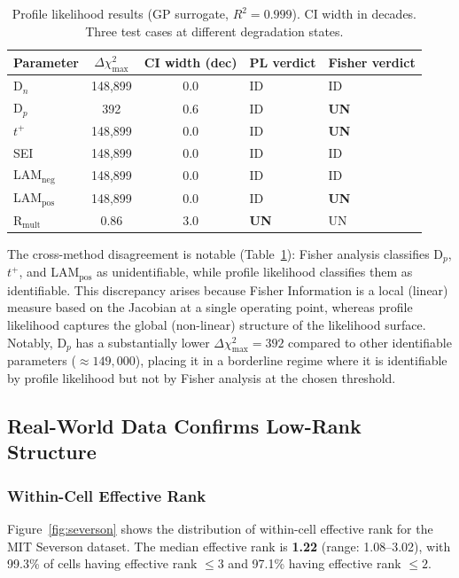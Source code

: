 \documentclass[preprint,12pt]{elsarticle}
\begin{document}
\begin{table}[htbp]
\centering
\caption{Profile likelihood results (GP surrogate, $R^2 = 0.999$). CI width in decades. Three test cases at different degradation states.}
\label{tab:pl}
\begin{tabular}{lccll}
\toprule
Parameter & $\Delta\chi^2_{\max}$ & CI width (dec) & PL verdict & Fisher verdict \\
\midrule
D$_n$ & 148{,}899 & 0.0 & ID & ID \\
D$_p$ & 392 & 0.6 & ID & \textbf{UN} \\
$t^+$ & 148{,}899 & 0.0 & ID & \textbf{UN} \\
SEI & 148{,}899 & 0.0 & ID & ID \\
LAM$_{\mathrm{neg}}$ & 148{,}899 & 0.0 & ID & ID \\
LAM$_{\mathrm{pos}}$ & 148{,}899 & 0.0 & ID & \textbf{UN} \\
R$_{\mathrm{mult}}$ & 0.86 & 3.0 & \textbf{UN} & UN \\
\bottomrule
\end{tabular}
\end{table}

The cross-method disagreement is notable (Table~\ref{tab:pl}): Fisher analysis classifies D$_p$, $t^+$, and LAM$_{\mathrm{pos}}$ as unidentifiable, while profile likelihood classifies them as identifiable.
This discrepancy arises because Fisher Information is a local (linear) measure based on the Jacobian at a single operating point, whereas profile likelihood captures the global (non-linear) structure of the likelihood surface.
Notably, D$_p$ has a substantially lower $\Delta\chi^2_{\max} = 392$ compared to other identifiable parameters ($\approx 149{,}000$), placing it in a borderline regime where it is identifiable by profile likelihood but not by Fisher analysis at the chosen threshold.

\subsection{Real-World Data Confirms Low-Rank Structure}
\label{sec:severson_results}

\subsubsection{Within-Cell Effective Rank}

Figure~\ref{fig:severson} shows the distribution of within-cell effective rank for the MIT Severson dataset.
The median effective rank is \textbf{1.22} (range: 1.08--3.02), with 99.3\% of cells having effective rank $\leq 3$ and 97.1\% having effective rank $\leq 2$.
\end{document}
